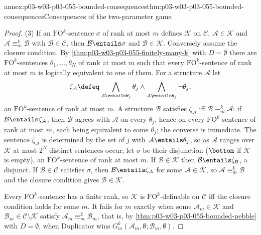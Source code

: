 \begin{annexitem}{annex:p03-w03-p03-055-bounded-consequences}{thm:p03-w03-p03-055-bounded-consequences}{Consequences of the two-parameter game}
\begin{proof}
(3) If an \(\mathrm{FO}^k\)-sentence \(\sigma\) of rank at most \(m\) defines
\(\mathcal K\) on \(\mathcal C\), \(\mathcal A\in\mathcal K\) and
\(\mathcal A\equiv^k_m\mathcal B\) with \(\mathcal B\in\mathcal C\), then
\(\mathcal B\entails\sigma\) and \(\mathcal B\in\mathcal K\). Conversely
assume the closure condition. By
\cref{thm:p03-w03-p03-055-finitely-many-k} with \(D=\emptyset\) there are
\(\mathrm{FO}^k\)-sentences \(\theta_1,\ldots,\theta_N\) of rank at most
\(m\) such that every \(\mathrm{FO}^k\)-sentence of rank at most \(m\) is
logically equivalent to one of them. For a structure \(\mathcal A\) let
\[
 \zeta_{\mathcal A}\defeq\bigwedge_{\mathcal A\entails\theta_j}\theta_j\wedge
 \bigwedge_{\mathcal A\not\entails\theta_j}\neg\theta_j ,
\]
an \(\mathrm{FO}^k\)-sentence of rank at most \(m\). A structure
\(\mathcal B\) satisfies \(\zeta_{\mathcal A}\) iff
\(\mathcal B\equiv^k_m\mathcal A\): if \(\mathcal B\entails\zeta_{\mathcal A}\),
then \(\mathcal B\) agrees with \(\mathcal A\) on every \(\theta_j\), hence on
every \(\mathrm{FO}^k\)-sentence of rank at most \(m\), each being equivalent
to some \(\theta_j\); the converse is immediate. The sentence
\(\zeta_{\mathcal A}\) is determined by the set of \(j\) with
\(\mathcal A\entails\theta_j\), so as \(\mathcal A\) ranges over
\(\mathcal K\) at most \(2^N\) distinct sentences occur; let \(\sigma\) be
their disjunction (\(\bottom\) if \(\mathcal K\) is empty), an
\(\mathrm{FO}^k\)-sentence of rank at most \(m\). If
\(\mathcal B\in\mathcal K\) then \(\mathcal B\entails\zeta_{\mathcal B}\), a
disjunct. If \(\mathcal B\in\mathcal C\) satisfies \(\sigma\), then
\(\mathcal B\entails\zeta_{\mathcal A}\) for some \(\mathcal A\in\mathcal K\), so
\(\mathcal A\equiv^k_m\mathcal B\) and the closure condition gives
\(\mathcal B\in\mathcal K\).

Every \(\mathrm{FO}^k\)-sentence has a finite rank, so \(\mathcal K\) is
\(\mathrm{FO}^k\)-definable on \(\mathcal C\) iff the closure condition holds
for some \(m\). It fails for \(m\) exactly when some
\(\mathcal A_m\in\mathcal K\) and \(\mathcal B_m\in\mathcal C\setminus
\mathcal K\) satisfy \(\mathcal A_m\equiv^k_m\mathcal B_m\), that is, by
\cref{thm:p03-w03-p03-055-bounded-pebble} with \(D=\emptyset\), when
Duplicator wins \(G^k_m(\mathcal A_m,\emptyset;\mathcal B_m,\emptyset)\).
\end{proof}
\end{annexitem}

